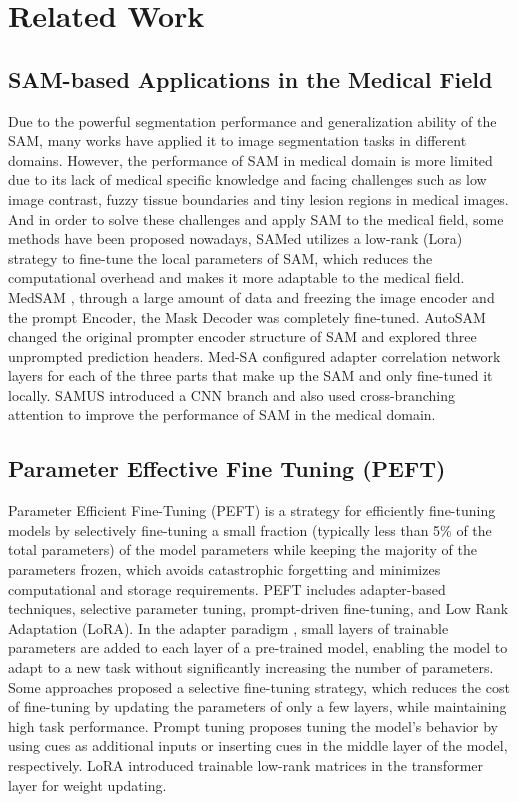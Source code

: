 \section{Related Work}
\subsection{SAM-based Applications in the Medical Field}
Due to the powerful segmentation performance and generalization ability of the SAM, many works have applied it to image segmentation tasks in different domains. However, the performance of SAM in medical domain is more limited due to its lack of medical specific knowledge and facing challenges such as low image contrast, fuzzy tissue boundaries and tiny lesion regions in medical images. And in order to solve these challenges and apply SAM to the medical field, some methods have been proposed nowadays, SAMed \cite{zhang2023customizedsegmentmodelmedical} utilizes a low-rank (Lora) strategy to fine-tune the local parameters of SAM, which reduces the computational overhead and makes it more adaptable to the medical field. MedSAM \cite{WOS:001148371500004}, through a large amount of data and freezing the image encoder and the prompt Encoder, the Mask Decoder was completely fine-tuned. AutoSAM \cite{INSPEC:23394927} changed the original prompter encoder structure of SAM and explored three unprompted prediction headers. Med-SA \cite{wu2023medicalsamadapteradapting} configured adapter correlation network layers for each of the three parts that make up the SAM and only fine-tuned it locally. SAMUS \cite{INSPEC:23780196} introduced a CNN branch and also used cross-branching attention to improve the performance of SAM in the medical domain.

\subsection{Parameter Effective Fine Tuning (PEFT) }
Parameter Efficient Fine-Tuning (PEFT) is a strategy for efficiently fine-tuning models by selectively fine-tuning a small fraction (typically less than 5\% of the total parameters) of the model parameters while keeping the majority of the parameters frozen, which avoids catastrophic forgetting and minimizes computational and storage requirements. PEFT includes adapter-based techniques, selective parameter tuning, prompt-driven fine-tuning, and Low Rank Adaptation (LoRA). In the adapter paradigm \cite{WOS:000684034302095}, small layers of trainable parameters are added to each layer of a pre-trained model, enabling the model to adapt to a new task without significantly increasing the number of parameters. Some approaches \cite{guo2021parameterefficienttransferlearningdiff} proposed a selective fine-tuning strategy, which reduces the cost of fine-tuning by updating the parameters of only a few layers, while maintaining high task performance. Prompt tuning \cite{WOS:000855966303015} \cite{WOS:000698679200153} proposes tuning the model's behavior by using cues as additional inputs or inserting cues in the middle layer of the model, respectively. LoRA \cite{hu2021lora} introduced trainable low-rank matrices in the transformer layer for weight updating.

